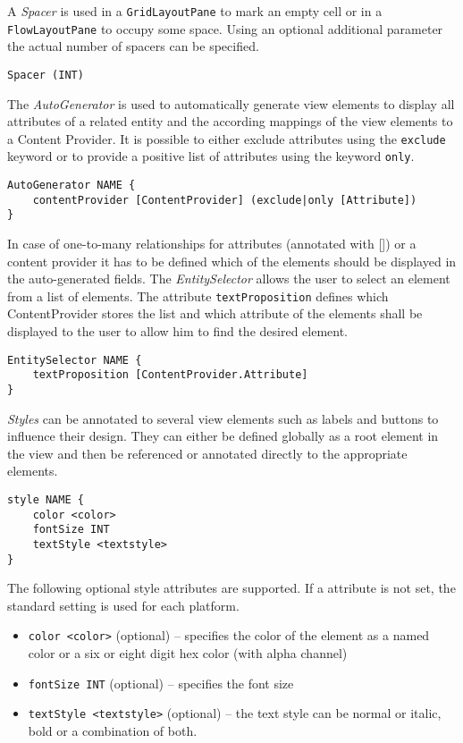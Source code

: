 A \textit{Spacer} is used in a \lstinline!GridLayoutPane! to mark an empty cell or in a \lstinline!FlowLayoutPane! to occupy some space. Using an optional additional parameter the actual number of spacers can be specified.
\begin{lstlisting}
Spacer (INT)
\end{lstlisting}

The \textit{AutoGenerator} is used to automatically generate view elements to display all attributes of a related entity and the according mappings of the view elements to a Content Provider. It is possible to either exclude attributes using the \lstinline!exclude! keyword or to provide a positive list of attributes using the keyword \lstinline!only!.
\begin{lstlisting}
AutoGenerator NAME {
	contentProvider [ContentProvider] (exclude|only [Attribute])
}
\end{lstlisting}

In case of one-to-many relationships for attributes (annotated with []) or a content provider it has to be defined which of the elements should be displayed in the auto-generated fields. The \textit{EntitySelector} allows the user to select an element from a list of elements. The attribute \lstinline!textProposition! defines which ContentProvider stores the list and which attribute of the elements shall be displayed to the user to allow him to find the desired element.
\begin{lstlisting}
EntitySelector NAME {
	textProposition [ContentProvider.Attribute]
}
\end{lstlisting}

\textit{Styles} can be annotated to several view elements such as labels and buttons to influence their design. They can either be defined globally as a root element in the view and then be referenced or annotated directly to the appropriate elements.
\begin{lstlisting}
style NAME {
	color <color>
	fontSize INT
	textStyle <textstyle>
}
\end{lstlisting}

The following optional style attributes are supported. If a attribute is not set, the standard setting is used for each platform.
\begin{itemize}
\item \lstinline!color <color>! (optional) -- specifies the color of the element as a named color or a six or eight digit hex color (with alpha channel)
\item \lstinline!fontSize INT! (optional) -- specifies the font size
\item \lstinline!textStyle <textstyle>! (optional) -- the text style can be normal or italic, bold or a combination of both.
\end{itemize}

